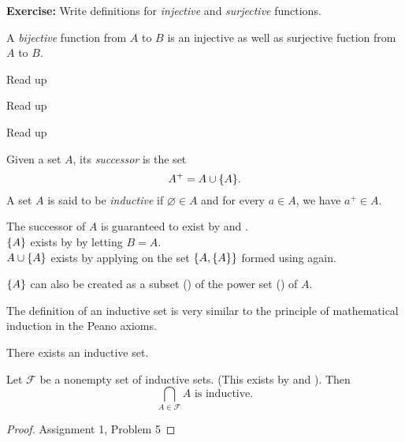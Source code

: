 \documentclass[12pt]{article}
\begin{document}
\textbf{Exercise:} Write definitions for \emph{injective} and \emph{surjective} functions.
\begin{rem}
    A \emph{bijective} function from $A$ to $B$ is an injective as well as surjective fuction from $A$ to $B$.
\end{rem}

\begin{axiom} \label{zfc:regularity}
    Read up
\end{axiom}
\begin{axiom} \label{zfc:replacement}
    Read up
\end{axiom}
\begin{axiom} \label{zfc:choice}
    Read up
\end{axiom}

\begin{defn} \label{defn:inductive}
    Given a set $A$, its \emph{successor} is the set \[
        A^{+} = A \cup \set{A}.
    \] A set $A$ is said to be \emph{inductive} if $\varnothing \in A$ and for every $a \in A$, we have $a^{+} \in A$.
\end{defn}
\begin{rem}
    The successor of $A$ is guaranteed to exist by  and . \\
    $\set{A}$ exists by  by letting $B = A$. \\
    $A \cup \set{A}$ exists by applying  on the set $\set{A, \{A}\}$ formed using  again.

    $\set{A}$ can also be created as a subset () of the power set () of $A$.
\end{rem}
\begin{rem}
    The definition of an inductive set is very similar to the principle of mathematical induction in the Peano axioms.
\end{rem}

\begin{axiom} \label{zfc:infinity}
    There exists an inductive set.    
\end{axiom}

\begin{lem} \label{lem:inductive intersection}
    Let $\mathscr{F}$ be a nonempty set of inductive sets. (This exists by  and ). Then \[
        \bigcap_{A \in \mathscr{F}}{A} \text{ is inductive.}
    \]
\end{lem}
\begin{proof}
    Assignment 1, Problem 5
\end{proof}
\end{document}
